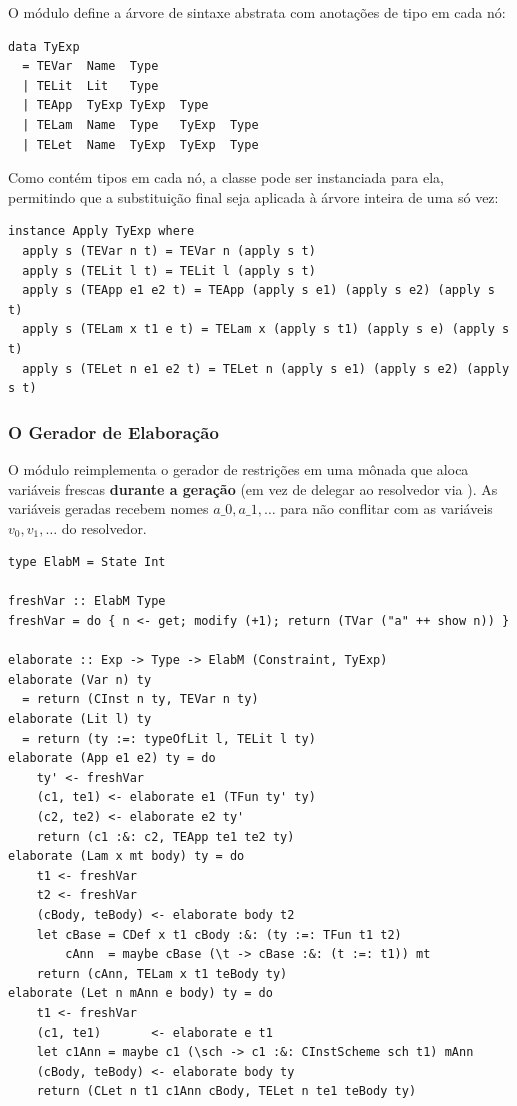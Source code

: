   O módulo  define a árvore de
  sintaxe abstrata com anotações de tipo em cada nó:

\begin{verbatim}
data TyExp
  = TEVar  Name  Type
  | TELit  Lit   Type
  | TEApp  TyExp TyExp  Type
  | TELam  Name  Type   TyExp  Type
  | TELet  Name  TyExp  TyExp  Type
\end{verbatim}

  Como  contém tipos em cada nó, a
  classe  pode ser instanciada para ela,
  permitindo que a substituição final seja aplicada à árvore inteira de
  uma só vez:

\begin{verbatim}
instance Apply TyExp where
  apply s (TEVar n t) = TEVar n (apply s t)
  apply s (TELit l t) = TELit l (apply s t)
  apply s (TEApp e1 e2 t) = TEApp (apply s e1) (apply s e2) (apply s t)
  apply s (TELam x t1 e t) = TELam x (apply s t1) (apply s e) (apply s t)
  apply s (TELet n e1 e2 t) = TELet n (apply s e1) (apply s e2) (apply s t)
\end{verbatim}

  \subsubsection{O Gerador de Elaboração}

  O módulo  reimplementa o gerador
  de restrições em uma mônada  que
  aloca variáveis frescas \textbf{durante a geração} (em vez de delegar
  ao resolvedor via ). As variáveis
  geradas recebem nomes \(a\_0, a\_1,
  \ldots\) para não conflitar com as variáveis \(v_0, v_1,
  \ldots\) do resolvedor.

\begin{verbatim}
type ElabM = State Int

freshVar :: ElabM Type
freshVar = do { n <- get; modify (+1); return (TVar ("a" ++ show n)) }

elaborate :: Exp -> Type -> ElabM (Constraint, TyExp)
elaborate (Var n) ty
  = return (CInst n ty, TEVar n ty)
elaborate (Lit l) ty
  = return (ty :=: typeOfLit l, TELit l ty)
elaborate (App e1 e2) ty = do
    ty' <- freshVar
    (c1, te1) <- elaborate e1 (TFun ty' ty)
    (c2, te2) <- elaborate e2 ty'
    return (c1 :&: c2, TEApp te1 te2 ty)
elaborate (Lam x mt body) ty = do
    t1 <- freshVar
    t2 <- freshVar
    (cBody, teBody) <- elaborate body t2
    let cBase = CDef x t1 cBody :&: (ty :=: TFun t1 t2)
        cAnn  = maybe cBase (\t -> cBase :&: (t :=: t1)) mt
    return (cAnn, TELam x t1 teBody ty)
elaborate (Let n mAnn e body) ty = do
    t1 <- freshVar
    (c1, te1)       <- elaborate e t1
    let c1Ann = maybe c1 (\sch -> c1 :&: CInstScheme sch t1) mAnn
    (cBody, teBody) <- elaborate body ty
    return (CLet n t1 c1Ann cBody, TELet n te1 teBody ty)
\end{verbatim}

